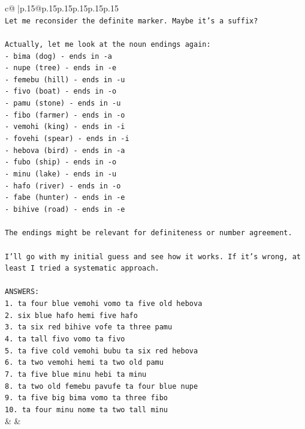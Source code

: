 \documentclass{article}
\begin{document}
{\begin{supertabular}{c@{$\;$}|p{.15\linewidth}@{}p{.15\linewidth}p{.15\linewidth}p{.15\linewidth}p{.15\linewidth}p{.15\linewidth}}
{{{\\ 
\texttt{Let me reconsider the definite marker. Maybe it's a suffix?} \\
\\ 
\texttt{Actually, let me look at the noun endings again:} \\
\texttt{{-} bima (dog) {-} ends in {-}a} \\
\texttt{{-} nupe (tree) {-} ends in {-}e} \\
\texttt{{-} femebu (hill) {-} ends in {-}u} \\
\texttt{{-} fivo (boat) {-} ends in {-}o} \\
\texttt{{-} pamu (stone) {-} ends in {-}u} \\
\texttt{{-} fibo (farmer) {-} ends in {-}o} \\
\texttt{{-} vemohi (king) {-} ends in {-}i} \\
\texttt{{-} fovehi (spear) {-} ends in {-}i} \\
\texttt{{-} hebova (bird) {-} ends in {-}a} \\
\texttt{{-} fubo (ship) {-} ends in {-}o} \\
\texttt{{-} minu (lake) {-} ends in {-}u} \\
\texttt{{-} hafo (river) {-} ends in {-}o} \\
\texttt{{-} fabe (hunter) {-} ends in {-}e} \\
\texttt{{-} bihive (road) {-} ends in {-}e} \\
\\ 
\texttt{The endings might be relevant for definiteness or number agreement.} \\
\\ 
\texttt{I'll go with my initial guess and see how it works. If it's wrong, at least I tried a systematic approach.} \\
\\ 
\texttt{ANSWERS:} \\
\texttt{1. ta four blue vemohi vomo ta five old hebova} \\
\texttt{2. six blue hafo hemi five hafo} \\
\texttt{3. ta six red bihive vofe ta three pamu} \\
\texttt{4. ta tall fivo vomo ta fivo} \\
\texttt{5. ta five cold vemohi bubu ta six red hebova} \\
\texttt{6. ta two vemohi hemi ta two old pamu} \\
\texttt{7. ta five blue minu hebi ta minu} \\
\texttt{8. ta two old femebu pavufe ta four blue nupe} \\
\texttt{9. ta five big bima vomo ta three fibo} \\
\texttt{10. ta four minu nome ta two tall minu} \\
            }
        }
    }
    & & \\ \\


\end{supertabular}}
\end{document}
